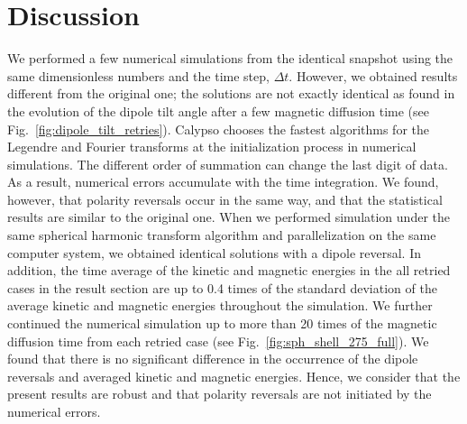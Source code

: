 \section{Discussion}
\label{section:discussion}

We performed a few numerical simulations from the identical snapshot using the same dimensionless numbers and the time step, $\Delta t$.
However, we obtained results different from the original one; the solutions are not exactly identical
as found in the evolution of the dipole tilt angle after a few magnetic diffusion time (see Fig.~\ref{fig:dipole_tilt_retries}). 
Calypso chooses the fastest algorithms for the Legendre and Fourier transforms at the initialization process in numerical simulations. 
The different order of summation can change the last digit of data. 
As a result, numerical errors accumulate with the time integration. 
We found, however, that polarity reversals occur in the same way, and that the statistical results are similar to the original one.
When we performed simulation under the same spherical harmonic transform algorithm and parallelization on the same computer system, we obtained identical solutions with a dipole reversal. In addition, the time average of the kinetic and magnetic energies in the all retried cases in the result section are up to 0.4 times of the standard deviation of the average kinetic and magnetic energies throughout the simulation. 
We further continued the numerical simulation up to more than 20 times of the magnetic diffusion time from each retried case (see Fig.~\ref{fig:sph_shell_275_full}).
We found that there is no significant difference in the occurrence of the dipole reversals and averaged kinetic and magnetic energies.
Hence, we consider that the present results are robust and that polarity reversals are not initiated by the numerical errors.

